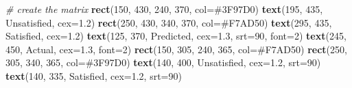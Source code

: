 \documentclass[
]{article}
\newenvironment{Shaded}{\begin{snugshade}}{\end{snugshade}}
\newcommand{\AttributeTok}[1]{\textcolor[rgb]{0.13,0.29,0.53}{#1}}
\newcommand{\CommentTok}[1]{\textcolor[rgb]{0.56,0.35,0.01}{\textit{#1}}}
\newcommand{\DecValTok}[1]{\textcolor[rgb]{0.00,0.00,0.81}{#1}}
\newcommand{\FloatTok}[1]{\textcolor[rgb]{0.00,0.00,0.81}{#1}}
\newcommand{\FunctionTok}[1]{\textcolor[rgb]{0.13,0.29,0.53}{\textbf{#1}}}
\newcommand{\NormalTok}[1]{#1}
\newcommand{\StringTok}[1]{\textcolor[rgb]{0.31,0.60,0.02}{#1}}
\begin{document}
\begin{Shaded}
\begin{Highlighting}[]
  \CommentTok{\# create the matrix }
  \FunctionTok{rect}\NormalTok{(}\DecValTok{150}\NormalTok{, }\DecValTok{430}\NormalTok{, }\DecValTok{240}\NormalTok{, }\DecValTok{370}\NormalTok{, }\AttributeTok{col=}\StringTok{\textquotesingle{}\#3F97D0\textquotesingle{}}\NormalTok{)}
  \FunctionTok{text}\NormalTok{(}\DecValTok{195}\NormalTok{, }\DecValTok{435}\NormalTok{, }\StringTok{\textquotesingle{}Unsatisfied\textquotesingle{}}\NormalTok{, }\AttributeTok{cex=}\FloatTok{1.2}\NormalTok{)}
  \FunctionTok{rect}\NormalTok{(}\DecValTok{250}\NormalTok{, }\DecValTok{430}\NormalTok{, }\DecValTok{340}\NormalTok{, }\DecValTok{370}\NormalTok{, }\AttributeTok{col=}\StringTok{\textquotesingle{}\#F7AD50\textquotesingle{}}\NormalTok{)}
  \FunctionTok{text}\NormalTok{(}\DecValTok{295}\NormalTok{, }\DecValTok{435}\NormalTok{, }\StringTok{\textquotesingle{}Satisfied\textquotesingle{}}\NormalTok{, }\AttributeTok{cex=}\FloatTok{1.2}\NormalTok{)}
  \FunctionTok{text}\NormalTok{(}\DecValTok{125}\NormalTok{, }\DecValTok{370}\NormalTok{, }\StringTok{\textquotesingle{}Predicted\textquotesingle{}}\NormalTok{, }\AttributeTok{cex=}\FloatTok{1.3}\NormalTok{, }\AttributeTok{srt=}\DecValTok{90}\NormalTok{, }\AttributeTok{font=}\DecValTok{2}\NormalTok{)}
  \FunctionTok{text}\NormalTok{(}\DecValTok{245}\NormalTok{, }\DecValTok{450}\NormalTok{, }\StringTok{\textquotesingle{}Actual\textquotesingle{}}\NormalTok{, }\AttributeTok{cex=}\FloatTok{1.3}\NormalTok{, }\AttributeTok{font=}\DecValTok{2}\NormalTok{)}
  \FunctionTok{rect}\NormalTok{(}\DecValTok{150}\NormalTok{, }\DecValTok{305}\NormalTok{, }\DecValTok{240}\NormalTok{, }\DecValTok{365}\NormalTok{, }\AttributeTok{col=}\StringTok{\textquotesingle{}\#F7AD50\textquotesingle{}}\NormalTok{)}
  \FunctionTok{rect}\NormalTok{(}\DecValTok{250}\NormalTok{, }\DecValTok{305}\NormalTok{, }\DecValTok{340}\NormalTok{, }\DecValTok{365}\NormalTok{, }\AttributeTok{col=}\StringTok{\textquotesingle{}\#3F97D0\textquotesingle{}}\NormalTok{)}
  \FunctionTok{text}\NormalTok{(}\DecValTok{140}\NormalTok{, }\DecValTok{400}\NormalTok{, }\StringTok{\textquotesingle{}Unsatisfied\textquotesingle{}}\NormalTok{, }\AttributeTok{cex=}\FloatTok{1.2}\NormalTok{, }\AttributeTok{srt=}\DecValTok{90}\NormalTok{)}
  \FunctionTok{text}\NormalTok{(}\DecValTok{140}\NormalTok{, }\DecValTok{335}\NormalTok{, }\StringTok{\textquotesingle{}Satisfied\textquotesingle{}}\NormalTok{, }\AttributeTok{cex=}\FloatTok{1.2}\NormalTok{, }\AttributeTok{srt=}\DecValTok{90}\NormalTok{)}


\end{Highlighting}
\end{Shaded}
\end{document}
